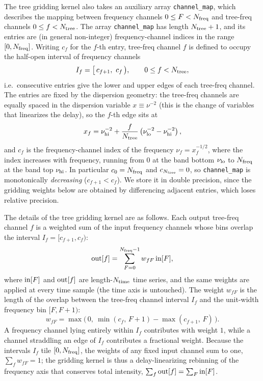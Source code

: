 \documentclass{article}
\numberwithin{equation}{section}   %
\begin{document}
The tree gridding kernel also takes an auxiliary array \verb|channel_map|, which describes the mapping between frequency channels $0 \le F < N_{\rm freq}$ and tree-freq channels $0 \le f < N_{\rm tree}$.
The array \verb|channel_map| has length $N_{\rm tree}+1$, and its entries are (in general non-integer) frequency-channel indices in the range $[0, N_{\rm freq}]$.
Writing $c_f$ for the $f$-th entry, tree-freq channel $f$ is defined to occupy the half-open interval of frequency channels
\begin{equation}
I_f = \big[\, c_{f+1},\ c_f \,\big), \qquad 0 \le f < N_{\rm tree},
\end{equation}
i.e.~consecutive entries give the lower and upper edges of each tree-freq channel.
The entries are fixed by the dispersion geometry: the tree-freq channels are equally spaced in the dispersion variable $x \equiv \nu^{-2}$ (this is the change of variables that linearizes the delay), so the $f$-th edge sits at
\begin{equation}
x_f = \nu_{\rm hi}^{-2} + \frac{f}{N_{\rm tree}}\left(\nu_{\rm lo}^{-2} - \nu_{\rm hi}^{-2}\right),
\end{equation}
and $c_f$ is the frequency-channel index of the frequency $\nu_f = x_f^{-1/2}$, where the index increases with frequency, running from $0$ at the band bottom $\nu_{\rm lo}$ to $N_{\rm freq}$ at the band top $\nu_{\rm hi}$.
In particular $c_0 = N_{\rm freq}$ and $c_{N_{\rm tree}} = 0$, so \verb|channel_map| is monotonically {\em decreasing} ($c_{f+1} < c_f$).
We store it in double precision, since the gridding weights below are obtained by differencing adjacent entries, which loses relative precision.

The details of the tree gridding kernel are as follows.
Each output tree-freq channel $f$ is a weighted sum of the input frequency channels whose bins overlap the interval $I_f = [c_{f+1}, c_f)$:
\begin{equation}
{\rm out}[f] = \sum_{F=0}^{N_{\rm freq}-1} w_{fF}\, {\rm in}[F],
\end{equation}
where ${\rm in}[F]$ and ${\rm out}[f]$ are length-$N_{\rm time}$ time series, and the same weights are applied at every time sample (the time axis is untouched).
The weight $w_{fF}$ is the length of the overlap between the tree-freq channel interval $I_f$ and the unit-width frequency bin $[F, F+1)$:
\begin{equation}
w_{fF} = \max\!\big(\,0,\ \min(c_f,\, F+1) - \max(c_{f+1},\, F)\,\big).
\end{equation}
A frequency channel lying entirely within $I_f$ contributes with weight $1$, while a channel straddling an edge of $I_f$ contributes a fractional weight.
Because the intervals $I_f$ tile $[0, N_{\rm freq}]$, the weights of any fixed input channel sum to one, $\sum_f w_{fF} = 1$; the gridding kernel is thus a delay-linearizing rebinning of the frequency axis that conserves total intensity, $\sum_f {\rm out}[f] = \sum_F {\rm in}[F]$.
\end{document}
